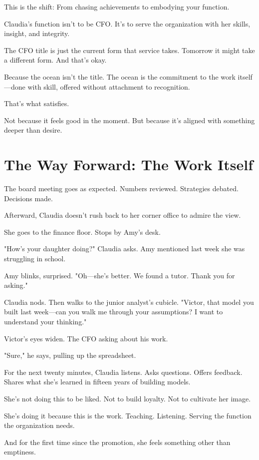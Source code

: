 \documentclass[11pt,twoside]{book}
\begin{document}
This is the shift: From chasing achievements to embodying your function.

Claudia's function isn't to be CFO. It's to serve the organization with her skills, insight, and integrity.

The CFO title is just the current form that service takes. Tomorrow it might take a different form. And that's okay.

Because the ocean isn't the title. The ocean is the commitment to the work itself—done with skill, offered without attachment to recognition.

That's what satisfies.

Not because it feels good in the moment. But because it's aligned with something deeper than desire.

\section*{The Way Forward: The Work Itself}

The board meeting goes as expected. Numbers reviewed. Strategies debated. Decisions made.

Afterward, Claudia doesn't rush back to her corner office to admire the view.

She goes to the finance floor. Stops by Amy's desk.

"How's your daughter doing?" Claudia asks. Amy mentioned last week she was struggling in school.

Amy blinks, surprised. "Oh—she's better. We found a tutor. Thank you for asking."

Claudia nods. Then walks to the junior analyst's cubicle. "Victor, that model you built last week—can you walk me through your assumptions? I want to understand your thinking."

Victor's eyes widen. The CFO asking about his work.

"Sure," he says, pulling up the spreadsheet.

For the next twenty minutes, Claudia listens. Asks questions. Offers feedback. Shares what she's learned in fifteen years of building models.

She's not doing this to be liked. Not to build loyalty. Not to cultivate her image.

She's doing it because this is the work. Teaching. Listening. Serving the function the organization needs.

And for the first time since the promotion, she feels something other than emptiness.
\end{document}
